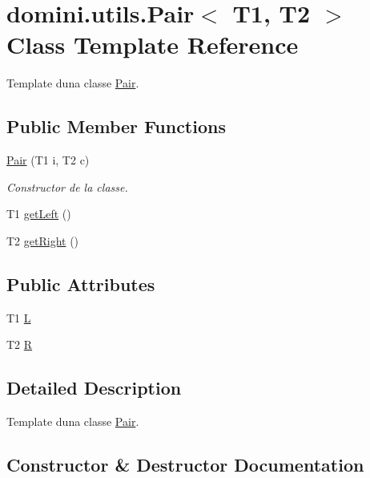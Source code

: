 \hypertarget{classdomini_1_1utils_1_1Pair}{}\section{domini.\+utils.\+Pair$<$ T1, T2 $>$ Class Template Reference}
\label{classdomini_1_1utils_1_1Pair}


Template d\textquotesingle{}una classe \hyperlink{classdomini_1_1utils_1_1Pair}{Pair}.  


\subsection*{Public Member Functions}
\begin{DoxyCompactItemize}
\item 
\hyperlink{classdomini_1_1utils_1_1Pair_a9db8755d5034cf4f99f9007b9d6fd22d}{Pair} (T1 i, T2 c)
\begin{DoxyCompactList}\small\item\em Constructor de la classe. \end{DoxyCompactList}\item 
T1 \hyperlink{classdomini_1_1utils_1_1Pair_a9439fbd8488cb1fbf00c57f15f093c4b}{get\+Left} ()
\item 
T2 \hyperlink{classdomini_1_1utils_1_1Pair_a0dca94eb1a43952258bebe1dca4c84e9}{get\+Right} ()
\end{DoxyCompactItemize}
\subsection*{Public Attributes}
\begin{DoxyCompactItemize}
\item 
T1 \hyperlink{classdomini_1_1utils_1_1Pair_a276a0eee9fa97fc27b37fab887f07cea}{L}
\item 
T2 \hyperlink{classdomini_1_1utils_1_1Pair_aebf54d48000999b84e5e24a2c62088d4}{R}
\end{DoxyCompactItemize}


\subsection{Detailed Description}
Template d\textquotesingle{}una classe \hyperlink{classdomini_1_1utils_1_1Pair}{Pair}. 

\subsection{Constructor \& Destructor Documentation}
\mbox{\label{classdomini_1_1utils_1_1Pair_a9db8755d5034cf4f99f9007b9d6fd22d}} 
